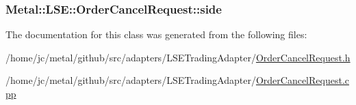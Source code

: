 \subsubsection[{side}]{ Metal\+::\+L\+S\+E\+::\+Order\+Cancel\+Request\+::side}\label{classMetal_1_1LSE_1_1OrderCancelRequest_a8147911f2234bdb988adfb6f43b7aaca}


The documentation for this class was generated from the following files\+:\begin{DoxyCompactItemize}
\item 
/home/jc/metal/github/src/adapters/\+L\+S\+E\+Trading\+Adapter/\hyperlink{OrderCancelRequest_8h}{Order\+Cancel\+Request.\+h}\item 
/home/jc/metal/github/src/adapters/\+L\+S\+E\+Trading\+Adapter/\hyperlink{OrderCancelRequest_8cpp}{Order\+Cancel\+Request.\+cpp}\end{DoxyCompactItemize}
